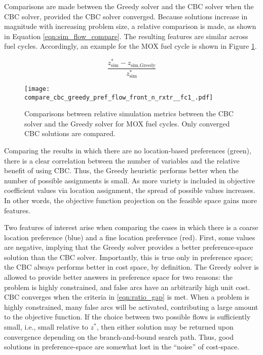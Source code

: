 Comparisons are made between the Greedy solver and the CBC solver when the CBC
solver, provided the CBC solver converged. Because solutions increase in
magnitude with increasing problem size, a relative comparison is made, as shown
in Equation \ref{eqn:sim_flow_compare}. The resulting features are similar
across fuel cycles. Accordingly, an example for the MOX fuel cycle is shown in
Figure \ref{fig:compare_cbc_greedy_pref_flow_front_n_rxtr__fc1_}.

\begin{equation}\label{eqn:sim_flow_compare}
\frac{z^*_{\text{sim}} - z_{\text{sim}, \text{Greedy}}}
     {z^*_{\text{sim}}} 
\end{equation}

\begin{figure}[h!]
  \begin{center}
    \texttt{[image: compare\_cbc\_greedy\_pref\_flow\_front\_n\_rxtr\_\_fc1\_.pdf]}
    \caption[]{
      \label{fig:compare_cbc_greedy_pref_flow_front_n_rxtr__fc1_}
      Comparisons between relative simulation metrics between the CBC solver and
      the Greedy solver for MOX fuel cycles. Only converged CBC
      solutions are compared.  }
  \end{center}
\end{figure}

Comparing the results in which there are no location-based preferences (green),
there is a clear correlation between the number of variables and the relative
benefit of using CBC. Thus, the Greedy heuristic performs better when the number
of possible assignments is small. As more variety is included in objective
coefficient values via location assignment, the spread of possible values
increases. In other words, the objective function projection on the feasible
space gains more features.

Two features of interest arise when comparing the cases in which there is a
coarse location preference (blue) and a fine location preference (red). First,
some values are negative, implying that the Greedy solver provides a better
preference-space solution than the CBC solver. Importantly, this is true only in
preference space; the CBC always performs better in cost space, by
definition. The Greedy solver is allowed to provide better answers in preference
space for two reasons: the problem is highly constrained, and false arcs have an
arbitrarily high unit cost. CBC converges when the criteria in
\ref{eqn:ratio_gap} is met. When a problem is highly constrained, many false
arcs will be activated, contributing a large amount to the objective
function. If the choice between two possible flows is sufficiently small, i.e.,
small relative to $z^*$, then either solution may be returned upon convergence
depending on the branch-and-bound search path. Thus, good solutions in
preference-space are somewhat lost in the ``noise'' of cost-space.

